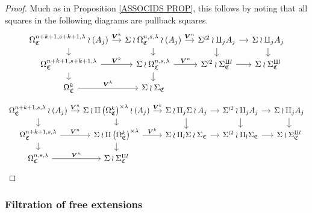\documentclass[a4paper,10pt
]{article}%
\numberwithin{equation}{section}
\numberwithin{figure}{section}
\theoremstyle{definition} %
\newcommand{\1}{\ensuremath{\mathbbm 1}}%
\newcommand{\OC}{\Omega_{\mathfrak C}}
\begin{document}
\begin{proof}
	Much as in Proposition \ref{ASSOCIDS PROP}, this follows by noting that all squares in the following diagrams are pullback squares.
\begin{equation}\label{LSTRINGS EQ}
\begin{tikzcd}[column sep = 11pt, row sep = 9pt]
	\OC^{n+k+1,s+k+1,\lambda} \arrow{r}{\boldsymbol{V}^k} \wr (A_j)
	\ar{d}
	&
	\Sigma \wr \OC^{n,s,\lambda} \wr (A_j) \ar{r}{\boldsymbol{V}^n} \ar{d}
	&
	\Sigma^{\wr 2} \wr \amalg_j A_j \arrow{r} \ar{d}
	&
	\Sigma \wr \amalg_j A_j \ar{d}
	\\
	\OC^{n+k+1,s+k+1,\lambda} \arrow{r}{\boldsymbol{V}^k} \arrow[d]
	&
	\Sigma \wr \OC^{n,s,\lambda} \arrow{r}{\boldsymbol{V}^n} \arrow[d]
	&
	\Sigma^{\wr 2} \wr \Sigma_{\mathfrak C}^{\amalg l} \ar{r}
	&
	\Sigma \wr \Sigma_{\mathfrak C}^{\amalg l}
	\\
	\OC^k \arrow{r}{\boldsymbol{V}^k}
	&
	\Sigma \wr \Sigma_{\mathfrak C}
	\end{tikzcd}
\end{equation}	
\begin{equation}
\begin{tikzcd}[column sep = 11pt, row sep = 9pt]
	\OC^{n+k+1,s,\lambda} \arrow{r}{\boldsymbol{V}^n} \wr (A_j)
	\ar{d}
	&
	\Sigma \wr \amalg \left(\OC^{k}\right)^{\times \lambda} \wr (A_j)
	\ar{r}{\boldsymbol{V}^k} \ar{d}
	&
	\Sigma \wr \amalg_j \Sigma \wr A_j \arrow{r} \ar{d}
	&
	\Sigma^{\wr 2} \wr \amalg_j A_j \arrow{r} \ar{d}
	&
	\Sigma \wr \amalg_j A_j \ar{d}
	\\
	\OC^{n+k+1,s,\lambda} \arrow{r}{\boldsymbol{V}^n} \arrow[d]
	&
	\Sigma \wr \amalg \left(\OC^{k}\right)^{\times \lambda} \arrow{r}{\boldsymbol{V}^k} \arrow[d]
	&
	\Sigma \wr \amalg_l \Sigma \wr \Sigma_{\mathfrak{C}} \ar{r}
	&
	\Sigma^{\wr 2} \wr \amalg_l \Sigma_{\mathfrak{C}} \ar{r}
	&
	\Sigma \wr \Sigma_{\mathfrak C}^{\amalg l}
	\\
	\OC^{n,s,\lambda} \arrow{r}{\boldsymbol{V}^n}
	&
	\Sigma \wr \Sigma_{\mathfrak C}^{\amalg l}
\end{tikzcd}
\end{equation}
\end{proof}





\subsubsection*{Filtration of free extensions}
\label{EQMON_SEC}
\end{document}
